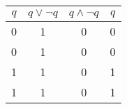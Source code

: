 \begin{table}[h]
	\centering
	\begin{tabular}{c | c | c | c}
		\(q\) & \(q \lor \neg q\) & \(q \land \neg q\) & \(q\) \\
		\hline
		0     & 1                 & 0                  & 0     \\
		0     & 1                 & 0                  & 0     \\
		1     & 1                 & 0                  & 1     \\
		1     & 1                 & 0                  & 1     \\
	\end{tabular}
\end{table}